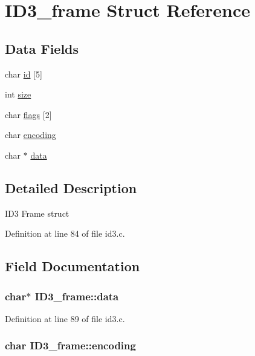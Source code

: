 \hypertarget{structID3__frame}{\section{I\-D3\-\_\-frame Struct Reference}
\label{structID3__frame}
}
\subsection*{Data Fields}
\begin{DoxyCompactItemize}
\item 
char \hyperlink{structID3__frame_a4dc7f26d0d8d874d4b26250017536c3a}{id} \mbox{[}5\mbox{]}
\item 
int \hyperlink{structID3__frame_aee185c3dc7a27b7d700c6b9b09b7268d}{size}
\item 
char \hyperlink{structID3__frame_a27277b31d6dff90dfae37812f745f371}{flags} \mbox{[}2\mbox{]}
\item 
char \hyperlink{structID3__frame_ab8764af80bfcc2e62fa99a1e47c5cc78}{encoding}
\item 
char $\ast$ \hyperlink{structID3__frame_a3acaed4840f6bddcfdf7d1a1679bdb57}{data}
\end{DoxyCompactItemize}


\subsection{Detailed Description}
I\-D3 Frame struct 

Definition at line 84 of file id3.\-c.



\subsection{Field Documentation}
\hypertarget{structID3__frame_a3acaed4840f6bddcfdf7d1a1679bdb57}{
\subsubsection[{data}]{\setlength{\rightskip}{0pt plus 5cm}char$\ast$ I\-D3\-\_\-frame\-::data}}\label{structID3__frame_a3acaed4840f6bddcfdf7d1a1679bdb57}


Definition at line 89 of file id3.\-c.

\hypertarget{structID3__frame_ab8764af80bfcc2e62fa99a1e47c5cc78}{
\subsubsection[{encoding}]{\setlength{\rightskip}{0pt plus 5cm}char I\-D3\-\_\-frame\-::encoding}}\label{structID3__frame_ab8764af80bfcc2e62fa99a1e47c5cc78}


